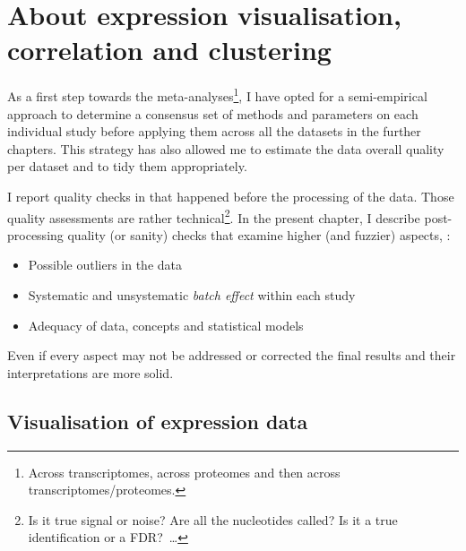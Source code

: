 \chapter{About expression visualisation, correlation and clustering}
\label{ch:expression}

\begin{comment}
\setlength{\epigraphwidth}{\textwidth}%
\setlength{\epigraphrule}{0pt}%
\epigraphhead[70]{%
\epigraph{[..] 80\% of the data analysis task is spent on cleaning and
understanding the data.}{\cite{Dasu2003-bg}}%
}
\end{comment}

As a first step towards the meta-analyses\footnote{Across transcriptomes,
across proteomes and then across transcriptomes/proteomes.},
I have opted for a semi-empirical approach to determine
a consensus set of methods and parameters on each individual study
before applying them across all the datasets in the further chapters.
This strategy has also allowed me
to estimate the data overall quality per dataset and to tidy them appropriately.

I report quality checks in 
that happened before the processing of the data.
Those quality assessments are rather technical\footnote{Is it true signal
or noise?
Are all the nucleotides called?
Is it a true identification or a \gls{FDR}?~\ldots}.
In the present chapter, I describe post-processing quality (or sanity) checks
that examine higher (and fuzzier) aspects, \eg:
\begin{itemize}[topsep=0pt,nosep]
    \item Possible outliers in the data
    \item Systematic and unsystematic \emph{batch effect} within each study
    \item Adequacy of data, concepts and statistical models
\end{itemize}
Even if every aspect may not be addressed or corrected the
final results and their interpretations are more solid.

\section{Visualisation of expression data}

